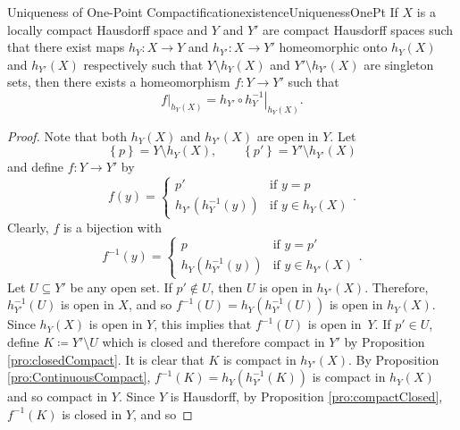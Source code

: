 \documentclass[math]{amznotes}
\theoremstyle{remark}
\begin{document}
\begin{probox}{Uniqueness of One-Point Compactification}{existenceUniquenessOnePt}
   If $X$ is a locally compact Hausdorff space and $Y$ and $Y'$ are compact Hausdorff spaces such that there exist maps $h_Y \colon X \to Y$ and $h_{Y'} \colon X \to Y'$ homeomorphic onto $h_Y\left(X\right)$ and $h_{Y'}\left(X\right)$ respectively such that $Y \setminus h_Y\left(X\right)$ and $Y' \setminus h_{Y'}\left(X\right)$ are singleton sets, then there exists a homeomorphism $f \colon Y \to Y'$ such that 
    \begin{equation*}
        \left.f\right\rvert_{h_Y\left(X\right)} = h_{Y'} \circ \left.h_{Y}^{-1}\right\rvert_{h_Y\left(X\right)}.
    \end{equation*}
    \tcblower
    \begin{proof}
        Note that both $h_Y\left(X\right)$ and $h_{Y'}\left(X\right)$ are open in $Y$. Let 
        \begin{equation*}
            \left\{p\right\} = Y \setminus h_Y\left(X\right), \qquad \left\{p'\right\} = Y' \setminus h_{Y'}\left(X\right)
        \end{equation*}
        and define $f \colon Y \to Y'$ by 
        \begin{equation*}
            f\left(y\right) = \begin{cases}
                p' & \textrm{if } y = p \\
                h_{Y'}\left(h_Y^{-1}\left(y\right)\right) & \textrm{if } y \in h_Y\left(X\right)
            \end{cases}.
        \end{equation*}
        Clearly, $f$ is a bijection with 
        \begin{equation*}
            f^{-1}\left(y\right) = \begin{cases}
                p & \textrm{if } y = p' \\
                h_{Y}\left(h_{Y'}^{-1}\left(y\right)\right) & \textrm{if } y \in h_{Y'}\left(X\right)
            \end{cases}.
        \end{equation*}
        Let $U \subseteq Y'$ be any open set. If $p' \notin U$, then $U$ is open in $h_{Y'}\left(X\right)$. Therefore, $h_{Y'}^{-1}\left(U\right)$ is open in $X$, and so $f^{-1}\left(U\right) = h_Y\left(h_{Y'}^{-1}\left(U\right)\right)$ is open in $h_Y\left(X\right)$. Since $h_Y\left(X\right)$ is open in $Y$, this implies that $f^{-1}\left(U\right)$ is open in~$Y$. If $p' \in U$, define $K \coloneqq Y' \setminus U$ which is closed and therefore compact in $Y'$ by Proposition \ref{pro:closedCompact}. It is clear that $K$ is compact in $h_{Y'}\left(X\right)$. By Proposition \ref{pro:ContinuousCompact}, $f^{-1}\left(K\right) = h_Y\left(h_{Y'}^{-1}\left(K\right)\right)$ is compact in $h_Y\left(X\right)$ and so compact in $Y$. Since $Y$ is Hausdorff, by Proposition \ref{pro:compactClosed}, $f^{-1}\left(K\right)$ is closed in $Y$, and so 

\end{proof}
\end{probox}
\end{document}
